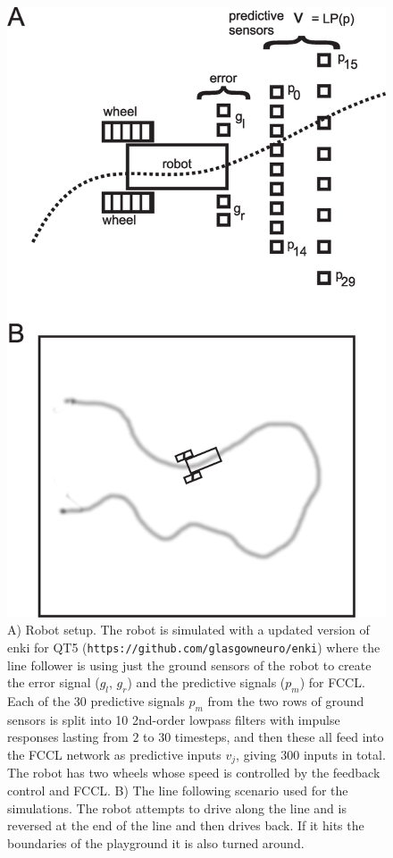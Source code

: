 \documentclass[Afour,sageh,times]{sagej}
\begin{document}
\begin{figure}[!ht]
  \centering
  \includegraphics[width=0.85\columnwidth]{linefollower_robot_playground}
  \caption{A) Robot setup. The robot is simulated with a updated
    version of enki for QT5 (\texttt{https://github.com/glasgowneuro/enki})
    where the line follower is using just the ground sensors of the
    robot to create the error signal ($g_l$, $g_r$) and the predictive signals ($p_m$)
    for FCCL. Each of the 30 predictive signals $p_m$ from the two rows of ground sensors
    is split into 10 2nd-order lowpass filters with impulse responses
    lasting from $2$ to $30$ timesteps, and then these all feed into the FCCL
    network as predictive inputs $v_j$, giving 300 inputs in total.
    The robot has two wheels whose speed is controlled
    by the feedback control and FCCL.
    B) The line following scenario used for the simulations. The robot
    attempts to drive along the line and is reversed at the end of the
    line and then drives back. If it hits the boundaries of the playground
    it is also turned around.
    \label{linefollower_robot_playground}}
\end{figure}
\end{document}
